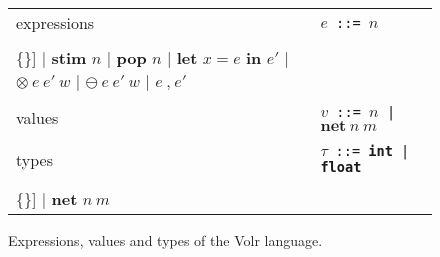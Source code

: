 \begin{figure}
  \begin{tabular}[t]{l l}
    expressions & \texttt{$e$ ::= $n$} \\
    & \begin{minipage}{0.6\textwidth}
      \begin{Verbatim}[mathescape,commandchars=\\\{\}]
    | \textbf{stim} $n$
    | \textbf{pop} $n$
    | \textbf{let} $x = e$ \textbf{in} $e'$
    | $\otimes\ e\ e'\ w$
    | $\ominus\ e\ e'\ w$
    | $e\ \textbf{,}\ e'$
      \end{Verbatim} 
      \end{minipage} \\

    & \\ %

    values
    & \texttt{$v$ ::= $n$ | $\textbf{net}\ n\ m$} \\
    
    & \\ %
    types
    & \texttt{$\tau$ ::= \textbf{int} | \textbf{float}} \\
    & \begin{minipage}{0.6\textwidth}
      \begin{Verbatim}[mathescape,commandchars=\\\{\}]
    | \textbf{net} $n\ m$
      \end{Verbatim}
    \end{minipage}
  \end{tabular}

  \caption{Expressions, values and types of the Volr language.}
  \label{fig:volr-expr}
\end{figure}
